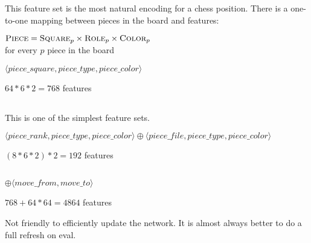 \subsection{\mdseries{}}

This feature set is the most natural encoding for a chess position. There is a one-to-one mapping between pieces in the board and features:

\begin{center}
    $\textsc{Piece} = \textsc{Square}_{p} \times \textsc{Role}_{p} \times \textsc{Color}_{p}$ \\
    for every $p$ piece in the board
\end{center}




$\langle piece\_square, piece\_type, piece\_color \rangle$

$64*6*2=768$ features


\subsection{\mdseries{}}

This is one of the simplest feature sets.

$\langle piece\_rank, piece\_type, piece\_color \rangle \oplus \langle piece\_file, piece\_type, piece\_color \rangle$

$(8*6*2)*2=192$ features

\subsection{\mdseries{}}

 $\oplus \langle move\_from, move\_to \rangle$

$768 + 64*64=4864$ features

Not friendly to efficiently update the network. It is almost always better to do a full refresh on eval.

\subsection{\mdseries{}}

